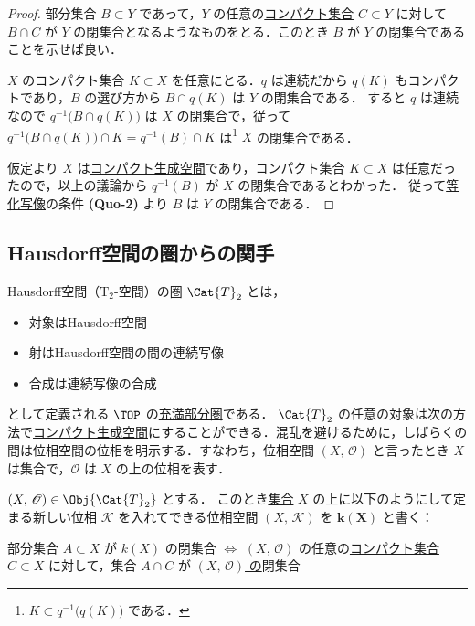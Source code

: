 \documentclass[algtopo_main]{subfiles}
\begin{document}
\begin{proof}
    部分集合 $B \subset Y$ であって，$Y$ の任意の\hyperref[def:compact]{コンパクト集合} $C \subset Y$ に対して $B \cap C$ が $Y$ の閉集合となるようなものをとる．このとき $B$ が $Y$ の閉集合であることを示せば良い．

    $X$ のコンパクト集合 $K \subset X$ を任意にとる．$q$ は連続だから $q(K)$ もコンパクトであり，$B$ の選び方から $B \cap q(K)$ は $Y$ の閉集合である．
    すると $q$ は連続なので $q^{-1} \bigl( B \cap q(K) \bigr)$ は $X$ の閉集合で，従って $q^{-1} \bigl( B \cap q(K) \bigr) \cap K = q^{-1}(B) \cap K$ は\footnote{$K \subset q^{-1} \bigl( q(K) \bigr)$ である．} $X$ の閉集合である．
    
    仮定より $X$ は\hyperref[def:CG]{コンパクト生成空間}であり，コンパクト集合 $K \subset X$ は任意だったので，以上の議論から $q^{-1}(B)$ が $X$ の閉集合であるとわかった．
    従って\hyperref[def:quotient-map]{等化写像}の条件 \textsf{\textbf{(Quo-2)}} より $B$ は $Y$ の閉集合である．
\end{proof}

\subsection{Hausdorff空間の圏からの関手}

Hausdorff空間（$\mathrm{T}_2$-空間）の圏 $\Cat{T}_2$ とは，
\begin{itemize}
    \item 対象はHausdorff空間
    \item 射はHausdorff空間の間の連続写像
    \item 合成は連続写像の合成
\end{itemize}
として定義される $\TOP$ の\hyperref[def:fullsub]{充満部分圏}である．
$\Cat{T}_2$ の任意の対象は次の方法で\hyperref[def:CG]{コンパクト生成空間}にすることができる．混乱を避けるために，しばらくの間は位相空間の位相を明示する．すなわち，位相空間 $(X,\, \mathscr{O})$ と言ったとき $X$ は集合で，$\mathscr{O}$ は $X$ の上の位相を表す．

\begin{mydef}[label=def:k-functor]{}
    $(X,\, \mathscr{O}) \in \Obj{\Cat{T}_2}$ とする．
    このとき\underline{集合} $X$ の上に以下のようにして定まる新しい位相 $\mathscr{K}$ を入れてできる位相空間 $(X,\, \mathscr{K})$ を $\bm{k(X)}$ と書く：

    部分集合 $A \subset X$ が $k(X)$ の閉集合 $\iff$ $(X,\, \mathscr{O})$ の任意の\hyperref[def:compact]{コンパクト集合} $C \subset X$ に対して，集合 $A \cap C$ が \underline{$(X,\, \mathscr{O})$ の}閉集合
\end{mydef}
\end{document}
